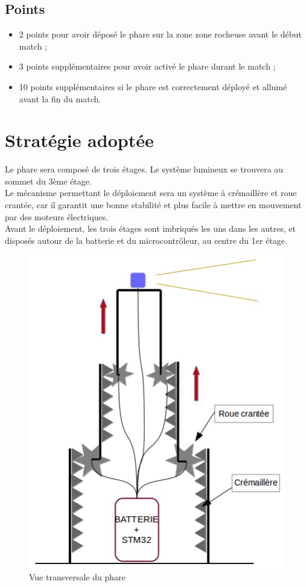 \documentclass{article}
\begin{document}
\pagebreak

\subsection{Points}
\begin{itemize}
\item 2 points pour avoir déposé le phare sur la zone zone rocheuse avant le début match ;
\item 3 points supplémentaires pour avoir activé le phare durant le match ;
\item 10 points supplémentaires si le phare est correctement déployé et allumé avant la fin du match.
\end{itemize}


\section{Stratégie adoptée}
Le phare sera composé de trois étages. Le système lumineux se trouvera au sommet du 3ème étage. \\
Le mécanisme permettant le déploiement sera un système à crémaillère et roue crantée,
car il garantit une bonne stabilité et plus facile à mettre en mouvement par des moteurs électriques. \\
Avant le déploiement, les trois étages sont imbriqués les uns dans les autres, et disposés autour de la
batterie et du microcontrôleur, au centre du 1er étage. \\
\begin{figure}[!h]
\centering
\includegraphics[scale=0.7]{Pictures/Schema_phare.png}
\caption{Vue transversale du phare}
\end{figure}
\end{document}
